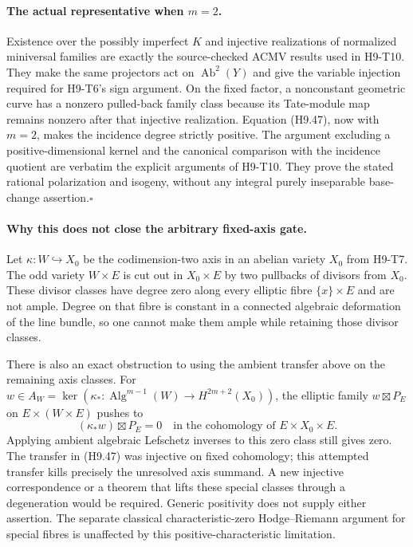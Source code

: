 \paragraph{The actual representative when $m=2$.}
Existence over the possibly imperfect $K$ and injective realizations
of normalized miniversal families are exactly the source-checked
ACMV results used in H9-T10. They make the same projectors act on
$\operatorname{Ab}^2(Y)$ and give the variable injection required
for H9-T6's sign argument. On the fixed factor, a nonconstant
geometric curve has a nonzero pulled-back family class because its
Tate-module map remains nonzero after that injective realization.
Equation (H9.47), now with $m=2$, makes the incidence degree strictly
positive. The argument excluding a positive-dimensional kernel and
the canonical comparison with the incidence quotient are verbatim
the explicit arguments of H9-T10. They prove the stated rational
polarization and isogeny, without any integral purely inseparable
base-change assertion.\hfill$\square$

\paragraph{Why this does not close the arbitrary fixed-axis gate.}
Let $\kappa:W\hookrightarrow X_0$ be the codimension-two axis in
an abelian variety $X_0$ from H9-T7. The odd variety $W\times E$ is
cut out in $X_0\times E$ by two pullbacks of divisors from $X_0$.
These divisor classes have degree zero along every elliptic fibre
$\{x\}\times E$ and are not ample. Degree on that fibre is constant
in a connected algebraic deformation of the line bundle, so one
cannot make them ample while retaining those divisor classes.

There is also an exact obstruction to using the ambient transfer
above on the remaining axis classes. For
$w\in A_W=\ker(\kappa_*:\operatorname{Alg}^{m-1}(W)
\to H^{2m+2}(X_0))$, the elliptic family $w\boxtimes P_E$
on $E\times(W\times E)$ pushes to
\[
 (\kappa_*w)\boxtimes P_E=0
       \quad\text{in the cohomology of }E\times X_0\times E.
\]
Applying ambient algebraic Lefschetz inverses to this zero class
still gives zero. The transfer in (H9.47) was injective on fixed
cohomology; this attempted transfer kills precisely the unresolved
axis summand. A new injective correspondence or a theorem that lifts
these special classes through a degeneration would be required.
Generic positivity does not supply either assertion. The separate
classical characteristic-zero Hodge--Riemann argument for special
fibres is unaffected by this positive-characteristic limitation.

